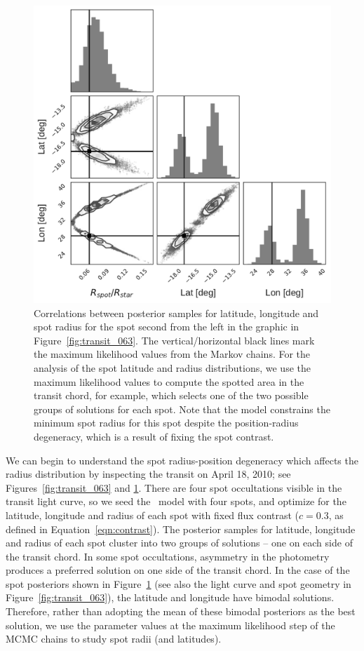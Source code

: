 \begin{figure}
\centering
\includegraphics[scale=0.45]{stsp_hat_p_11/063_spot1_rll.pdf}
\caption{Correlations between posterior samples for latitude, longitude and spot radius for the spot second from the left in the graphic in Figure~\ref{fig:transit_063}. The vertical/horizontal black lines mark the maximum likelihood values from the Markov chains. For the analysis of the spot latitude and radius distributions, we use the maximum likelihood values to compute the spotted area in the transit chord, for example, which selects one of the two possible groups of solutions for each spot. Note that the model constrains the minimum spot radius for this spot despite the position-radius degeneracy, which is a result of fixing the spot contrast.}
\label{fig:corner_063}
\end{figure}

We can begin to understand the spot radius-position degeneracy which affects the radius distribution by inspecting the transit on April 18, 2010; see Figures~\ref{fig:transit_063}  and \ref{fig:corner_063}. There are four spot occultations visible in the transit light curve, so we seed the \stsp\ model with four spots, and optimize for the latitude, longitude and radius of each spot with fixed flux contrast ($c=0.3$, as defined in Equation~\ref{eqn:contrast}). The posterior samples for latitude, longitude and radius of each spot cluster into two groups of solutions -- one on each side of the transit chord. In some spot occultations, asymmetry in the photometry produces a preferred solution on one side of the transit chord. In the case of the spot posteriors shown in Figure~\ref{fig:corner_063} (see also the light curve and spot geometry in Figure~\ref{fig:transit_063}), the latitude and longitude have bimodal solutions. Therefore, rather than adopting the mean of these bimodal posteriors as the best solution, we use the parameter values at the maximum likelihood step of the MCMC chains to study spot radii (and latitudes).

